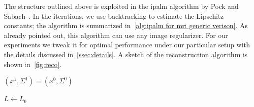 The structure outlined above is exploited in the \gls{ipalm} algorithm by Pock and Sabach~\cite{pock_inertial_2016}.
In the iterations, we use backtracking to estimate the Lipschitz constants; the algorithm is summarized in~\cref{alg:ipalm for mri generic verison}.
As already pointed out, this algorithm can use any image regularizer.
For our experiments we tweak it for optimal performance under our particular setup with the details discussed in~\cref{ssec:details}.
A sketch of the reconstruction algorithm is shown in~\cref{fig:reco}.

\begin{algorithm}
	\DontPrintSemicolon%
	\( (x^{\num{1}}, \Sigma^{1}) = (x^{\num{0}}, \Sigma^{\num{0}}) \)\;
	\caption{%
		\gls{ipalm}~\cite{pock_inertial_2016} instantiation to solve~\eqref{eq:joint inversion optimization problem}.
		\( \operatorname{bt} \) is~\cref{alg:backtrack}.
	}%
	\label{alg:ipalm for mri generic verison}
\end{algorithm}
\begin{algorithm}
	\DontPrintSemicolon%
	\( L \leftarrow L_{\num{0}} \)\;
	\caption{%
		Backtracking procedure to find the local Lipschitz constants in~\cref{alg:ipalm}.
	}%
	\label{alg:backtrack}
\end{algorithm}

